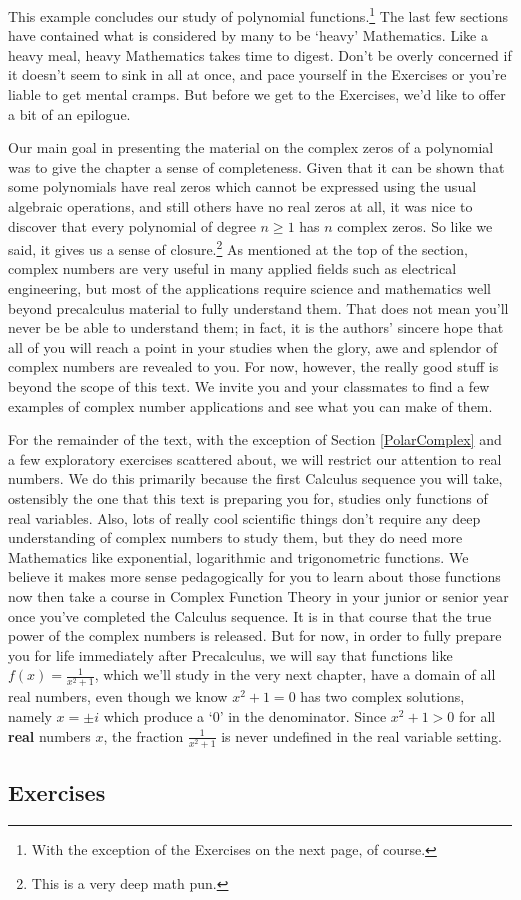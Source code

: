 \documentclass{ximera}
\begin{document}
This example concludes our study of polynomial functions.\footnote{With the exception of the Exercises on the next page, of course.}  The last few sections have contained what is considered by many to be `heavy' Mathematics.  Like a heavy meal, heavy Mathematics takes time to digest.  Don't be overly concerned if it doesn't seem to sink in all at once, and pace yourself in the Exercises or you're liable to get mental cramps.  But before we get to the Exercises, we'd like to offer a bit of an epilogue.  

\medskip

\label{complexepilogue}

Our main goal in presenting the material on the complex zeros of a polynomial was to give the chapter a sense of completeness.  Given that it can be shown that some polynomials have real zeros which cannot be expressed using the usual algebraic operations, and still others have no real zeros at all, it was nice to discover that every polynomial of degree $n \geq 1$ has $n$ complex zeros.  So like we said, it gives us a sense of closure.\footnote{This is a very deep math pun.}  As mentioned at the top of the section, complex numbers are very useful in many applied fields such as electrical engineering,  but most of the applications require science and mathematics well beyond precalculus material to fully understand them.  That does not mean you'll never be be able to understand them; in fact, it is the authors' sincere hope that all of you will reach a point in your studies when the glory, awe and splendor of complex numbers are revealed to you.  For now, however, the really good stuff is beyond the scope of this text. We invite you and your classmates to find a few examples of complex number applications and see what you can make of them. 

\medskip

For the remainder of the text, with the exception of Section \ref{PolarComplex} and a few exploratory exercises scattered about, we will restrict our attention to real numbers.  We do this primarily because the first Calculus sequence you will take, ostensibly the one that this text is preparing you for, studies only functions of real variables.  Also, lots of really cool scientific things don't require any deep understanding of complex numbers to study them, but they do need more Mathematics like exponential, logarithmic and trigonometric functions.  We believe it makes more sense pedagogically for you to learn about those functions now then take a course in Complex Function Theory in your junior or senior year once you've completed the Calculus sequence.  It is in that course that the true power of the complex numbers is released.  But for now, in order to fully prepare you for life immediately after Precalculus, we will say that functions like $f(x) = \frac{1}{x^{2} + 1}$, which we'll study in the very next chapter,  have a domain of all real numbers, even though we know $x^{2} + 1 = 0$ has two complex solutions, namely $x = \pm i$ which produce a `$0$' in the denominator.  Since $x^{2} + 1 > 0$ for all \textbf{real} numbers $x$, the fraction $\frac{1}{x^{2} + 1}$ is never undefined in the real variable setting.

\newpage

\subsection{Exercises}


\closegraphsfile
\end{document}

